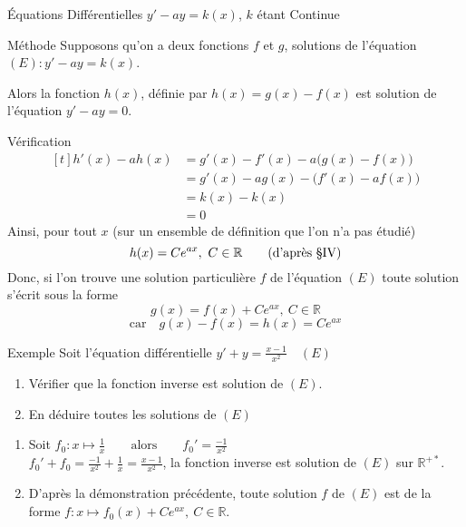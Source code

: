 \documentclass{cours}
\begin{document}
    \begin{Gpartie}{Équations Différentielles $y'-ay=k(x)$, $k$ étant Continue} 
        \begin{Spartie}{Méthode} 
            Supposons qu'on a deux fonctions $f$ et $g$, solutions de l'équation $(E): y'-ay=k(x)$.

            Alors la fonction $h(x)$, définie par $h(x)=g(x)-f(x)$ est solution de l'équation $y'-ay=0$.
            \begin{SSpartie}{Vérification} 
                \[\begin{aligned}[t]
                    h'(x)-ah(x)&=g'(x)-f'(x)-a\big(g(x)-f(x)\big) \\
                    &=g'(x)-ag(x)-\big(f'(x)-af(x)\big) \\
                    &=k(x)-k(x) \\
                    &=0
                \end{aligned}\]
                Ainsi, pour tout $x$ (sur un ensemble de définition que l'on n’a pas étudié)
                \[h(x)=Ce^{ax},\ C\in\mathbb{R}\qquad\text{(d'après \textsection IV)}\]
                Donc, si l'on trouve une solution particulière $f$ de l'équation $(E)$ toute solution s'écrit sous la forme
                \[g(x)=f(x)+Ce^{ax},\ C\in\mathbb{R}\]
                \[\text{car}\quad g(x)-f(x)=h(x)=Ce^{ax}\] 
            \end{SSpartie}
        \end{Spartie}
        \begin{Spartie}{Exemple} 
            Soit l'équation différentielle $y'+y=\frac{x-1}{x^2}\quad(E)$
            \begin{enumerate}
                \item Vérifier que la fonction inverse est solution de $(E)$.
                \item En déduire toutes les solutions de $(E)$
            \end{enumerate}
            \begin{enumerate}
                \item Soit $f_0:x\mapsto\frac{1}{x}\qquad\text{alors}\qquad f_0'=\frac{-1}{x^2}$ \\
                $f_0'+f_0=\frac{-1}{x^2}+\frac{1}{x}=\frac{x-1}{x^2}$, la fonction inverse est solution de $(E)$ sur $\mathbb{R^{+*}}$.
                \item D'après la démonstration précédente, toute solution $f$ de $(E)$ est de la forme $f:x\mapsto f_0(x)+Ce^{ax},\ C\in\mathbb{R}$. \\

\end{enumerate}
\end{Spartie}
\end{Gpartie}
\end{document}

